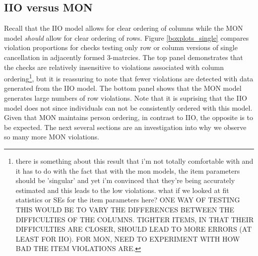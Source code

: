 \documentclass[12pt]{article}
\begin{document}
\subsection{IIO versus MON} \label{iio_mon}
Recall that the IIO model allows for clear ordering of columns while the MON model {\em should} allow for clear ordering of rows. Figure \ref{boxplots_single} compares violation proportions for checks testing only row or column versions of single cancellation in adjacently formed 3-matrcies. The top panel demonstrates that the checks are relatively insensitive to violations associated with column ordering\footnote{there is something about this result that i'm not totally comfortable with and it has to do with the fact that with the mon models, the item parameters should be 'singular' and yet i'm convinced that they're being accurately estimated and this leads to the low violations. what if we looked at fit statistics or SEs for the item parameters here?
ONE WAY OF TESTING THIS WOULD BE TO VARY THE DIFFERENCES BETWEEN THE DIFFICULTIES OF THE COLUMNS. TIGHTER ITEMS, IN THAT THEIR DIFFICULTIES ARE CLOSER, SHOULD LEAD TO MORE ERRORS (AT LEAST FOR IIO). FOR MON, NEED TO EXPERIMENT WITH HOW BAD THE ITEM VIOLATIONS ARE.}, but it is reassuring to note that fewer violations are detected with data generated from the IIO model. The bottom panel shows that the MON model generates large numbers of row violations. Note that it is suprising that the IIO model does not since individuals can not be consistently ordered with this model.  Given that MON maintains person ordering, in contrast to IIO, the opposite is to be expected. The next several sections are an investigation into why we observe so many more MON violations. 
\end{document}
